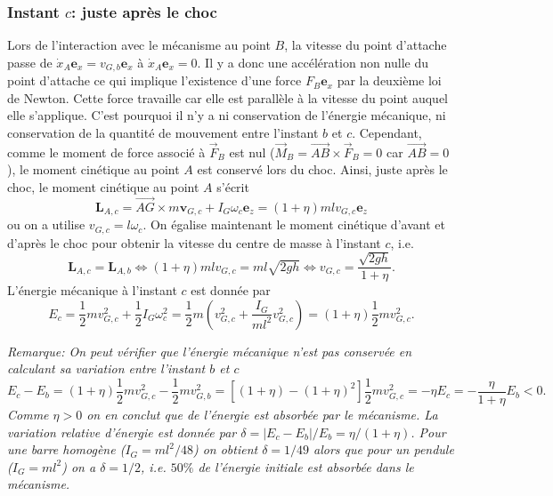 \documentclass[11pt,a4paper]{exam}
\newcommand{\exACDH}{\bm e_x}
\newcommand{\ezACDH}{\bm e_z}
\newcommand{\noteACDH}[1]{\textit{Remarque: #1}}
\begin{document}
\begin{parts}
    \subsubsection*{Instant $c$: juste après le choc}
    Lors de l'interaction avec le mécanisme au point $B$, la vitesse du point d'attache passe de $\dot x_{A}\exACDH =v_{G,b}\exACDH$ à $\dot x_{A}\exACDH =0$.
    Il y a donc une accélération non nulle du point d'attache ce qui implique l'existence d'une force $F_B\exACDH$ par la deuxième loi de Newton.
    Cette force travaille car elle est parallèle à la vitesse du point auquel elle s'applique.
    C'est pourquoi il n'y a ni conservation de l'énergie mécanique, ni conservation de la quantité de mouvement entre l'instant $b$ et $c$.
    Cependant, comme le moment de force associé à $\vec F_B$ est nul ($\vec M_B=\overrightarrow{AB}\times\vec F_B = 0$ car $\overrightarrow{AB}=0$), le moment cinétique au point $A$ est conservé lors du choc.
    Ainsi, juste après le choc, le moment cinétique au point $A$ s'écrit
    \begin{equation}
        \bm L_{A,c} =\overrightarrow{AG}\times m \bm v_{G,c} + I_G \omega_c \ezACDH = (1+\eta)mlv_{G,c}\ezACDH
    \end{equation}
    ou on a utilise $v_{G,c} =  l\omega_c$.
    On égalise maintenant le moment cinétique d'avant et d'après le choc pour obtenir la vitesse du centre de masse à l'instant $c$, i.e.
    \begin{equation}
        \bm L_{A,c} = \bm L_{A,b} \Leftrightarrow (1+\eta)mlv_{G,c} = ml\sqrt{2gh} \Leftrightarrow v_{G,c}= \frac{\sqrt{2gh}}{1+\eta}.
        \label{eq:mcin_A_c}
    \end{equation}
    L'énergie mécanique à l'instant $c$ est donnée par
    \begin{equation}
    E_{c} = \frac{1}{2}mv_{G,c}^2 + \frac{1}{2}I_G\omega_c^2 = \frac{1}{2}m\left(v_{G,c}^2 + \frac{I_G}{ml^2}v_{G,c}^2\right) = (1+\eta)\frac{1}{2}m v_{G,c}^2.
    \end{equation}
    
    \noteACDH{On peut vérifier que l'énergie mécanique n'est pas conservée en calculant sa variation entre l'instant $b$ et $c$
    $$
    E_{c} - E_{b} = (1+\eta)\frac{1}{2}m v_{G,c}^2 - \frac{1}{2}mv_{G,b}^2 =\left[(1+\eta) - (1+\eta)^2\right]\frac{1}{2}m v_{G,c}^2 = -\eta E_{c} = -\frac{\eta}{1+\eta}E_b < 0.
    $$
    Comme $\eta>0$ on en conclut que de l'énergie est absorbée par le mécanisme.
    La variation relative d'énergie est donnée par $\delta = |E_c-E_b|/E_b = \eta/(1+\eta)$. 
    Pour une barre homogène ($I_G = ml^2/48$) on obtient $\delta = 1/49$ alors que pour un pendule ($I_G=ml^2$) on a $\delta = 1/2$, i.e. $50\%$ de l'énergie initiale est absorbée dans le mécanisme.}
    

\end{parts}
\end{document}

